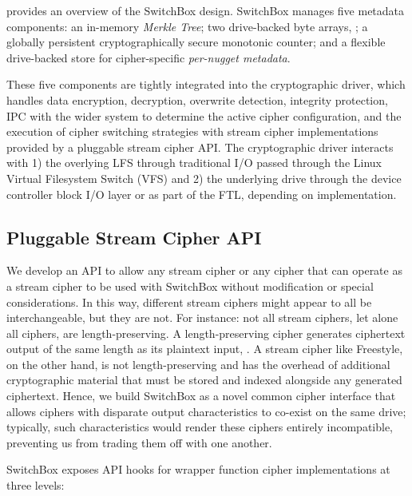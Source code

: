  provides an overview of the SwitchBox design. SwitchBox
manages five metadata components: an in-memory \emph{Merkle Tree}; two
drive-backed byte arrays, ; a globally persistent cryptographically secure
monotonic counter; and a flexible drive-backed store for cipher-specific
\emph{per-nugget metadata}.

These five components are tightly integrated into the cryptographic driver,
which handles data encryption, decryption, overwrite detection, integrity
protection, IPC with the wider system to determine the active cipher
configuration, and the execution of cipher switching strategies with stream
cipher implementations provided by a pluggable stream cipher API. The
cryptographic driver interacts with 1) the overlying LFS through traditional I/O
passed through the Linux Virtual Filesystem Switch (VFS) and 2) the underlying
drive through the device controller block I/O layer or as part of the FTL,
depending on implementation.

\subsection{Pluggable Stream Cipher API}

We develop an API to allow any stream cipher or any cipher that can operate as a
stream cipher to be used with SwitchBox without modification or special
considerations. In this way, different stream ciphers might appear to all be
interchangeable, but they are not. For instance: not all stream ciphers, let
alone all ciphers, are length-preserving. A length-preserving cipher generates
ciphertext output of the same length as its plaintext input, . A
stream cipher like Freestyle, on the other hand, is not length-preserving and has the
overhead of additional cryptographic material that must be stored and indexed
alongside any generated ciphertext. Hence, we build SwitchBox as a novel common
cipher interface that allows ciphers with disparate output
characteristics to co-exist on the same drive; typically, such characteristics
would render these ciphers entirely incompatible, preventing us from trading
them off with one another.

SwitchBox exposes API hooks for wrapper function cipher implementations at three
levels:

